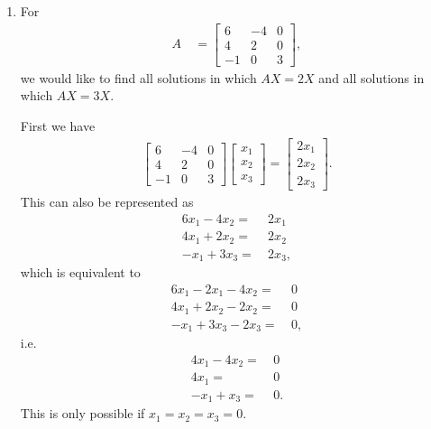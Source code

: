 \documentclass[12pt]{article}
\begin{document}
\begin{enumerate}
    \item
      For
      \begin{align*}
        A\ & =
        \begin{bmatrix}
          6 & -4 & 0\\
          4 &  2 & 0\\
         -1 &  0 & 3
        \end{bmatrix},
      \end{align*}
      we would like to find all solutions in which $AX = 2X$ and
      all solutions in which $AX = 3X$.

      First we have
      \begin{align*}
        \begin{bmatrix}
          6 & -4 & 0\\
          4 &  2 & 0\\
         -1 &  0 & 3
        \end{bmatrix}
        \begin{bmatrix}
          x_1 \\
          x_2 \\
          x_3
        \end{bmatrix}
        =
        \begin{bmatrix}
          2x_1 \\
          2x_2 \\
          2x_3
        \end{bmatrix}.
      \end{align*}
      This can also be represented as
      \begin{align*}
        6x_1 - 4x_2 =&\ 2x_1\\
        4x_1 + 2x_2 =&\ 2x_2\\
        -x_1 + 3x_3 =&\ 2x_3,
      \end{align*}
      which is equivalent to
      \begin{align*}
        6x_1 - 2x_1 - 4x_2 =&\ 0\\
        4x_1 + 2x_2 - 2x_2 =&\ 0\\
        -x_1 + 3x_3 - 2x_3 =&\ 0,
      \end{align*}
      i.e.
      \begin{align*}
        4x_1 - 4x_2 =&\ 0\\
        4x_1        =&\ 0\\
        -x_1 +  x_3 =&\ 0.
      \end{align*}
      This is only possible if $x_1 = x_2 = x_3 = 0$.\\


\end{enumerate}
\end{document}
